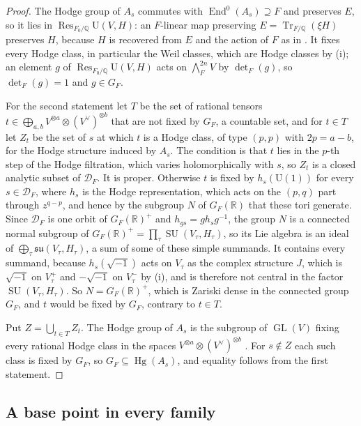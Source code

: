 \documentclass[11pt,reqno]{amsart}
\theoremstyle{plain}
\theoremstyle{definition}
\theoremstyle{remark}
\newcommand{\QQ}{\mathbb{Q}}
\newcommand{\RR}{\mathbb{R}}
\newcommand{\cD}{\mathcal{D}}
\DeclareMathOperator{\End}{End}
\DeclareMathOperator{\Res}{Res}
\DeclareMathOperator{\Hg}{Hg}
\DeclareMathOperator{\Tr}{Tr}
\DeclareMathOperator{\GL}{GL}
\DeclareMathOperator{\SU}{SU}
\begin{document}
\begin{proof}
The Hodge group of $A_{s}$ commutes with $\End^{0}(A_{s})\supseteq F$ and
preserves $E$, so it lies in $\Res_{F_{0}/\QQ}\mathrm{U}(V,H)$: an $F$-linear
map preserving $E=\Tr_{F/\QQ}(\xi H)$ preserves $H$, because $H$ is recovered
from $E$ and the action of $F$ as in . It fixes every Hodge
class, in particular the Weil classes, which are Hodge classes by
(i); an element $g$ of $\Res_{F_{0}/\QQ}\mathrm{U}(V,H)$ acts
on $\bigwedge^{2n}_{F}V$ by $\det_{F}(g)$, so $\det_{F}(g)=1$ and
$g\in G_{F}$.

For the second statement let $T$ be the set of rational tensors
$t\in\bigoplus_{a,b}V^{\otimes a}\otimes(V^{\vee})^{\otimes b}$ that are not
fixed by $G_{F}$, a countable set, and for $t\in T$ let $Z_{t}$ be the set of
$s$ at which $t$ is a Hodge class, of type $(p,p)$ with $2p=a-b$, for the
Hodge structure induced by $A_{s}$. The condition is that $t$ lies in the
$p$-th step of the Hodge filtration, which varies holomorphically with $s$, so
$Z_{t}$ is a closed analytic subset of $\cD_{F}$. It is proper. Otherwise $t$
is fixed by $h_{s}(\mathrm{U}(1))$ for every $s\in\cD_{F}$, where $h_{s}$ is
the Hodge representation, which acts on the $(p,q)$ part through
$z^{q-p}$, and hence by the
subgroup $N$ of $G_{F}(\RR)$ that these tori generate. Since $\cD_{F}$ is one
orbit of $G_{F}(\RR)^{+}$ and $h_{gs}=gh_{s}g^{-1}$, the group $N$ is a
connected normal subgroup of $G_{F}(\RR)^{+}=\prod_{\tau}\SU(V_{\tau},H_{\tau})$,
so its Lie algebra is an ideal of
$\bigoplus_{\tau}\mathfrak{su}(V_{\tau},H_{\tau})$, a sum of some of these
simple summands. It contains every summand, because $h_{s}(\sqrt{-1})$ acts on
$V_{\tau}$ as the complex structure $J$, which is $\sqrt{-1}$ on
$V^{+}_{\tau}$ and $-\sqrt{-1}$ on $V^{-}_{\tau}$ by (i),
and is therefore not central in the factor $\SU(V_{\tau},H_{\tau})$. So
$N=G_{F}(\RR)^{+}$, which is Zariski dense in the connected group $G_{F}$,
and $t$ would be fixed by $G_{F}$, contrary to $t\in T$.

Put $Z=\bigcup_{t\in T}Z_{t}$. The Hodge group of $A_{s}$ is the subgroup of
$\GL(V)$ fixing every rational Hodge class in the spaces
$V^{\otimes a}\otimes(V^{\vee})^{\otimes b}$ \cite[\S3]{Del82}.
For $s\notin Z$ each such class is fixed by $G_{F}$, so
$G_{F}\subseteq\Hg(A_{s})$, and equality follows from the first statement.
\end{proof}

\subsection{A base point in every family}
\end{document}
